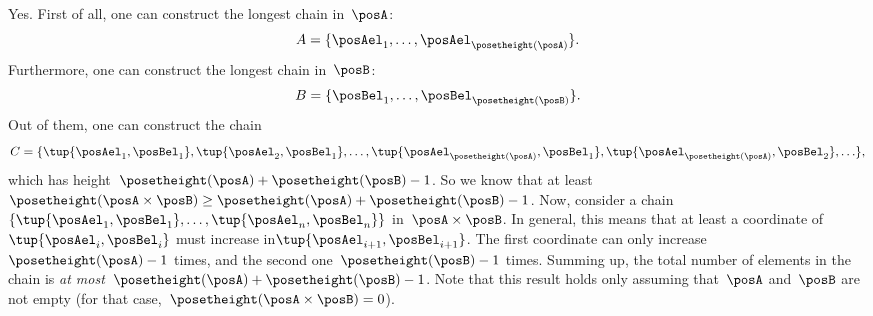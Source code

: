 \begin{solution}
    Yes. First of all, one can construct the longest chain in~$\posA$:
    \begin{equation*}
        A=\{\posAel_1,\ldots, \posAel_{\posetheight(\posA)}\}.
    \end{equation*}
    Furthermore, one can construct the longest chain in~$\posB$:
    \begin{equation*}
        B=\{\posBel_1,\ldots, \posBel_{\posetheight(\posB)}\}.
    \end{equation*}
    Out of them, one can construct the chain
    \begin{equation*}
        C=\{ \tup{\posAel_1,\posBel_1},\tup{\posAel_2,\posBel_1},\ldots, \tup{\posAel_{\posetheight(\posA)}, \posBel_1}, \tup{\posAel_{\posetheight(\posA)}, \posBel_2},\ldots\},
    \end{equation*}
    which has height~$\posetheight(\posA)+\posetheight(\posB)-1$. So we know that at least~$\posetheight(\posA\times \posB)\geq \posetheight(\posA)+\posetheight(\posB)-1$.
    Now, consider a chain~$\{\tup{\posAel_1,\posBel_1},\ldots, \tup{\posAel_n,\posBel_n}\}$ in~$\posA\times \posB$.
    In general, this means that at least a coordinate of~$\tup{\posAel_{i},\posBel_{i}}$ must increase in$\tup{\posAel_{i+1},\posBel_{i+1}}$.
    The first coordinate can only increase~$\posetheight(\posA)-1$ times, and the second one~$\posetheight(\posB)-1$ times. Summing up, the total number of elements in the chain is \emph{at most}~$\posetheight(\posA)+\posetheight(\posB)-1$.
    Note that this result holds only assuming that~$\posA$ and~$\posB$ are not empty (for that case,~$\posetheight(\posA\times \posB)=0$).
\end{solution}

